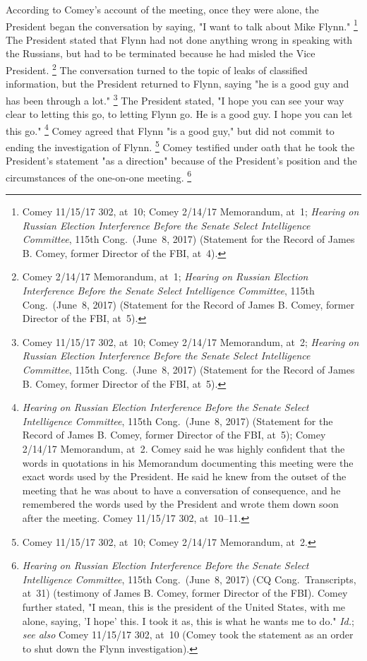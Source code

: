 According to Comey's account of the meeting, once they were alone, the President began the conversation by saying, "I want to talk about Mike Flynn."%
\footnote{Comey 11/15/17 302, at~10;
Comey 2/14/17 Memorandum, at~1;
\textit{Hearing on Russian Election Interference Before the Senate Select Intelligence Committee}, 115th Cong.\ (June~8, 2017) (Statement for the Record of James B. Comey, former Director of the FBI, at~4).}
The President stated that Flynn had not done anything wrong in speaking with the Russians, but had to be terminated because he had misled the Vice President.%
\footnote{Comey 2/14/17 Memorandum, at~1;
\textit{Hearing on Russian Election Interference Before the Senate Select Intelligence Committee}, 115th Cong.\ (June~8, 2017) (Statement for the Record of James B. Comey, former Director of the FBI, at~5).}
The conversation turned to the topic of leaks of classified information, but the President returned to Flynn, saying "he is a good guy and has been through a lot."%
\footnote{Comey 11/15/17 302, at~10;
Comey 2/14/17 Memorandum, at~2;
\textit{Hearing on Russian Election Interference Before the Senate Select Intelligence Committee}, 115th Cong.\ (June~8, 2017) (Statement for the Record of James B. Comey, former Director of the FBI, at~5).}
The President stated, "I hope you can see your way clear to letting this go, to letting Flynn go.
He is a good guy.
I hope you can let this go."%
\footnote{\textit{Hearing on Russian Election Interference Before the Senate Select Intelligence Committee}, 115th Cong.\ (June~8, 2017) (Statement for the Record of James B. Comey, former Director of the FBI, at~5);
Comey 2/14/17 Memorandum, at~2.
Comey said he was highly confident that the words in quotations in his Memorandum documenting this meeting were the exact words used by the President.
He said he knew from the outset of the meeting that he was about to have a conversation of consequence, and he remembered the words used by the President and wrote them down soon after the meeting.
Comey 11/15/17 302, at~10--11.}
Comey agreed that Flynn "is a good guy," but did not commit to ending the investigation of Flynn.%
\footnote{Comey 11/15/17 302, at~10;
Comey 2/14/17 Memorandum, at~2.}
Comey testified under oath that he took the President's statement "as a direction" because of the President's position and the circumstances of the one-on-one meeting.%
\footnote{\textit{Hearing on Russian Election Interference Before the Senate Select Intelligence Committee}, 115th Cong.\ (June~8, 2017) (CQ Cong.\ Transcripts, at~31) (testimony of James B. Comey, former Director of the FBI).
Comey further stated, "I mean, this is the president of the United States, with me alone, saying, 'I hope' this.
I took it as, this is what he wants me to do." \textit{Id.};
\textit{see also} Comey 11/15/17 302, at~10 (Comey took the statement as an order to shut down the Flynn investigation).}

